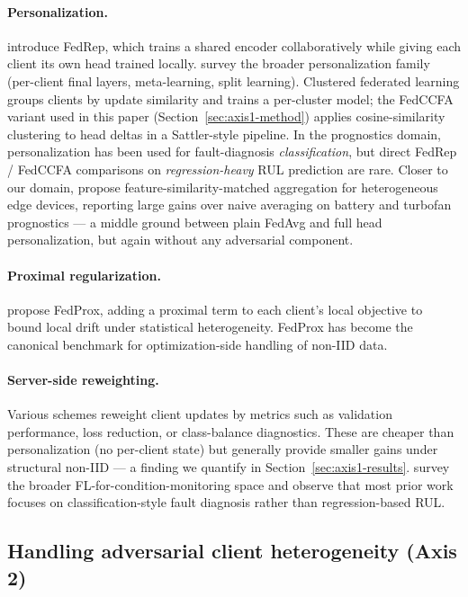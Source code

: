 \documentclass[a4paper,fleqn,doubleblind]{cas-sc}
\begin{document}
\paragraph{Personalization.}
\citet{Collins2021FedRep} introduce FedRep, which trains a shared
encoder collaboratively while giving each client its own head
trained locally. \citet{Kairouz2021Advances} survey the broader
personalization family (per-client final layers, meta-learning,
split learning). Clustered federated learning
\citep{Sattler2020CFL} groups clients by update similarity and
trains a per-cluster model; the FedCCFA variant used in this
paper (Section~\ref{sec:axis1-method}) applies cosine-similarity
clustering to head deltas in a Sattler-style pipeline. In the
prognostics domain, personalization has been used for
fault-diagnosis \emph{classification}, but direct FedRep /
FedCCFA comparisons on \emph{regression-heavy} RUL prediction
are rare. Closer to our domain, \citet{Arunan2023MatchedFeatureFL}
propose feature-similarity-matched aggregation for heterogeneous
edge devices, reporting large gains over naive averaging on battery
and turbofan prognostics --- a middle ground between plain FedAvg and
full head personalization, but again without any adversarial
component.

\paragraph{Proximal regularization.}
\citet{Li2020FedProx} propose FedProx, adding a proximal term to
each client's local objective to bound local drift under
statistical heterogeneity. FedProx has become the canonical
benchmark for optimization-side handling of non-IID data.

\paragraph{Server-side reweighting.}
Various schemes reweight client updates by metrics such as
validation performance, loss reduction, or class-balance
diagnostics. These are cheaper than personalization (no
per-client state) but generally provide smaller gains under
structural non-IID --- a finding we quantify in
Section~\ref{sec:axis1-results}. \citet{Berghout2022FLCondMon}
survey the broader FL-for-condition-monitoring space and observe
that most prior work focuses on classification-style fault
diagnosis rather than regression-based RUL.

\subsection{Handling adversarial client heterogeneity (Axis 2)}
\label{subsec:related-axis2}
\end{document}
